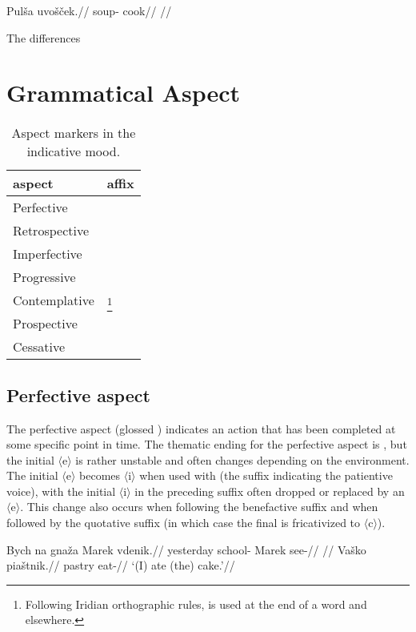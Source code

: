 \pex
\begingl
\gla Pulša uvošček.//
\glb soup- cook//
\glft {}//
\endgl
\xe


\par The differences

\section{Grammatical Aspect}
\begin{table}[h!]\small
	\caption{Aspect markers in the indicative mood.}
	\medskip
	\begin{tabu} to 0.5\textwidth{YY[0.5]}
		\toprule
		{\sc aspect}	& {\sc affix}\\
		\midrule
		Perfective		& \\
		Retrospective	& \\
		Imperfective	& \\
		Progressive		&  \\
		Contemplative	& \footnote{Following Iridian orthographic rules,  is used at the end of a word and  elsewhere.}\\
		Prospective		& \\
		Cessative		& \\
		\bottomrule
	\end{tabu}

\end{table}
\subsection{Perfective aspect}
The perfective aspect (glossed \Pf{}) indicates an action that has been completed at some specific point in time. The thematic ending for the perfective aspect is , but the initial $\langle$e$\rangle$ is rather unstable and often changes depending on the environment. The initial $\langle$e$\rangle$ becomes $\langle$i$\rangle$ when used with  (the suffix indicating the patientive voice), with the initial $\langle$i$\rangle$ in the preceding suffix often dropped or replaced by an $\langle$e$\rangle$. This change also occurs when following the benefactive suffix  and when followed by the quotative suffix  (in which case the final  is fricativized to $\langle$c$\rangle$).

\pex
\a\begingl
\gla Bych na gnaža Marek vdenik.//
\glb yesterday  school- Marek see-//
\glft {}//
\endgl
\a\begingl
\gla Vaško piaštnik.//
\glb pastry eat-//
\glft `(I) ate (the) cake.'//
\endgl
\xe


